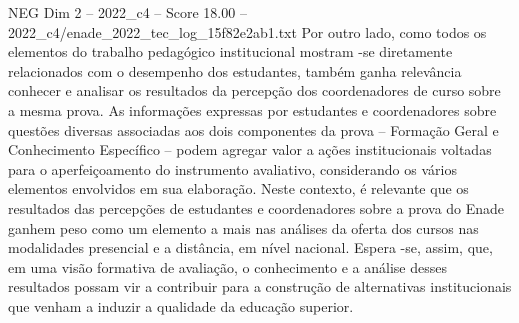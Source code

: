 \begin{textsample}{NEG Dim 2 – 2022\_c4 – Score 18.00 – 2022\_c4/enade\_2022\_tec\_log\_15f82e2ab1.txt}
Por outro lado, como todos os elementos do trabalho pedagógico institucional mostram -se diretamente relacionados com o desempenho dos estudantes, também ganha relevância conhecer e analisar os resultados da percepção dos coordenadores de curso sobre a mesma prova.
As informações expressas por estudantes e coordenadores sobre questões diversas associadas aos dois componentes da prova – Formação Geral e Conhecimento Específico – podem agregar valor a ações institucionais voltadas para o aperfeiçoamento do instrumento avaliativo, considerando os vários elementos envolvidos em sua elaboração.
Neste contexto, é relevante que os resultados das percepções de estudantes e coordenadores sobre a prova do Enade ganhem peso como um elemento a mais nas análises da oferta dos cursos nas modalidades presencial e a distância, em nível nacional.
Espera -se, assim, que, em uma visão formativa de avaliação, o conhecimento e a análise desses resultados possam vir a contribuir para a construção de alternativas institucionais que venham a induzir a qualidade da educação superior.

\end{textsample}
